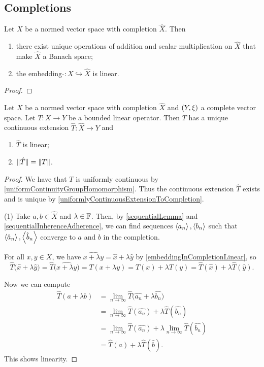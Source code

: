 \subsection{Completions}
\begin{lemma} \label{embeddingInCompletionLinear}
Let $X$ be a normed vector space with completion $\hat{X}$. Then
\begin{enumerate}
\item there exist unique operations of addition and scalar multiplication on $\hat{X}$ that make $\hat{X}$ a Banach space;
\item the embedding $\hat{}: X \hookrightarrow \hat{X}$ is linear.
\end{enumerate}
\end{lemma}
\begin{proof}

\end{proof}


\begin{proposition}
Let $X$ be a normed vector space with completion $\hat{X}$ and $\sSet{Y, \xi}$ a complete vector space. Let $T: X\to Y$ be a bounded linear operator. Then $T$ has a unique continuous extension $\hat{T}: \hat{X} \to Y$ and
\begin{enumerate}
\item $\hat{T}$ is linear;
\item $\lVert\hat{T}\rVert = \lVert T\rVert$.
\end{enumerate}
\end{proposition}
\begin{proof}
We have that $T$ is uniformly continuous by \ref{uniformContinuityGroupHomomorphism}. Thus the continuous extension $\hat{T}$ exists and is unique by \ref{uniformlyContinuousExtensionToCompletion}.

(1) Take $a,b\in \hat{X}$ and $\lambda \in \mathbb{F}$. Then, by \ref{sequentialLemma} and \ref{sequentialInherenceAdherence}, we can find sequences $\left\langle a_n \right\rangle, \left\langle b_n \right\rangle$ such that $\left\langle \hat{a}_n \right\rangle, \left\langle \hat{b}_n \right\rangle$ converge to $a$ and $b$ in the completion.

For all $x,y\in X$, we have $\widehat{x+\lambda y} = \hat{x} + \lambda \hat{y}$ by \ref{embeddingInCompletionLinear}, so
\[ \hat{T}\big(\hat{x} + \lambda \hat{y}\big) = \hat{T}\big(\widehat{x+\lambda y}\big) = T(x+\lambda y) = T(x) + \lambda T(y) = \hat{T}(\hat{x}) + \lambda \hat{T}(\hat{y}). \]

Now we can compute
\begin{align*}
\hat{T}(a+ \lambda b) &= \lim_{n\to \infty}\hat{T}\big(\hat{a_n} + \lambda \hat{b_n}\big) \\
&= \lim_{n\to \infty}\hat{T}(\hat{a_n}) + \lambda \hat{T}(\hat{b_n}) \\
&= \lim_{n\to \infty}\hat{T}(\hat{a_n}) + \lambda \lim_{n\to \infty}\hat{T}(\hat{b_n}) \\
&= \hat{T}(a) + \lambda \hat{T}(\hat{b}).
\end{align*}
This shows linearity.
\end{proof}


